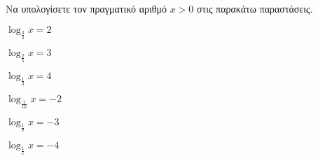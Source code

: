 Να υπολογίσετε τον πραγματικό αριθμό $ x>0 $ στις παρακάτω παραστάσεις.
\begin{multicols}{2}
\begin{rlist}
\item $ \log_{\frac{3}{4}}{x}=2 $
\item $ \log_{\frac{2}{5}}{x}=3 $
\item $ \log_{\frac{1}{3}}{x}=4 $
\item $ \log_{\frac{1}{10}}{x}=-2 $
\item $ \log_{\frac{1}{8}}{x}=-3 $
\item $ \log_{\frac{1}{e}}{x}=-4 $
\end{rlist}
\end{multicols}
